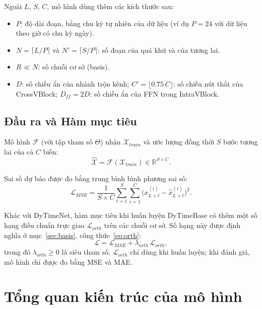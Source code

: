 \documentclass[12pt,a4paper]{report}
\numberwithin{equation}{chapter}
\newcommand{\R}{\mathbb{R}}
\begin{document}
Ngoài $L$, $S$, $C$, mô hình dùng thêm các kích thước sau:
\begin{itemize}
  \item $P$: độ dài đoạn, bằng chu kỳ tự nhiên của dữ liệu (ví dụ $P=24$ với dữ liệu theo giờ có chu kỳ ngày).
  \item $N=\lceil L/P\rceil$ và $N'=\lceil S/P\rceil$: số đoạn của quá khứ và của tương lai.
  \item $R\ll N$: số chuỗi cơ sở (basis).
  \item $D$: số chiều ẩn của nhánh trộn kênh; $C'=\lfloor 0.75\,C\rfloor$: số chiều nút thắt của CrossVBlock;
        $D_{ff}=2D$: số chiều ẩn của FFN trong IntraVBlock.
\end{itemize}

\subsection{Đầu ra và Hàm mục tiêu}

Mô hình $\mathcal{F}$ (với tập tham số $\Theta$) nhận $\mathcal{X}_{train}$ và ước lượng đồng thời
$S$ bước tương lai của cả $C$ biến:
\begin{equation}
\hat{\mathcal{X}} = \mathcal{F}(\mathcal{X}_{train}) \in \R^{S\times C}.
\label{eq:model}
\end{equation}

Sai số dự báo được đo bằng trung bình bình phương sai số:
\begin{equation}
\mathcal{L}_{MSE} = \frac{1}{S\times C}\sum_{t=1}^{S}\sum_{i=1}^{C}\Big(x^{(i)}_{L+t}-\hat{x}^{(i)}_{L+t}\Big)^2 .
\label{eq:mse}
\end{equation}

Khác với DyTimeNet, hàm mục tiêu khi huấn luyện DyTimeBase có thêm một số hạng điều chuẩn trực giao
$\mathcal{L}_{orth}$ trên các chuỗi cơ sở. Số hạng này được định nghĩa ở mục~\ref{sec:basis}, công
thức~\eqref{eq:orth}:
\begin{equation}
\mathcal{L} = \mathcal{L}_{MSE} + \lambda_{orth}\,\mathcal{L}_{orth},
\label{eq:objective}
\end{equation}
trong đó $\lambda_{orth}\ge 0$ là siêu tham số. $\mathcal{L}_{orth}$ chỉ dùng khi huấn luyện; khi đánh giá, mô hình
chỉ được đo bằng MSE và MAE.

\section{Tổng quan kiến trúc của mô hình}
\end{document}
